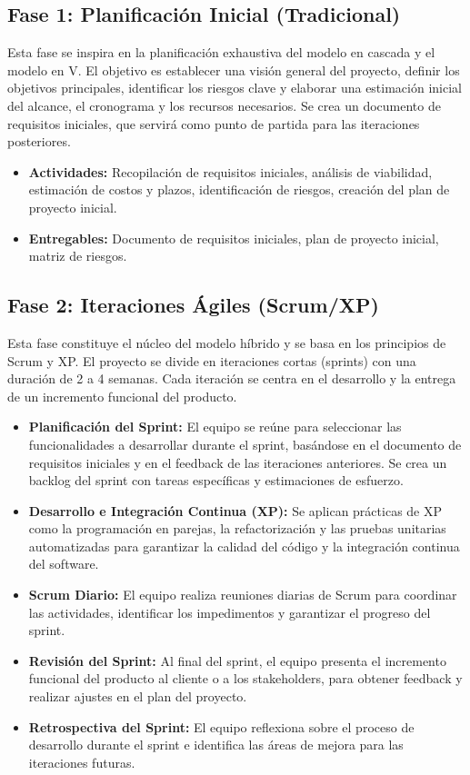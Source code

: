 \documentclass[12pt, spanish]{article}
\begin{document}
\subsection*{Fase 1: Planificación Inicial (Tradicional)}

Esta fase se inspira en la planificación exhaustiva del modelo en cascada y el modelo en V.  El objetivo es establecer una visión general del proyecto, definir los objetivos principales, identificar los riesgos clave y elaborar una estimación inicial del alcance, el cronograma y los recursos necesarios. Se crea un documento de requisitos iniciales, que servirá como punto de partida para las iteraciones posteriores.

\begin{itemize}
    \item \textbf{Actividades:} Recopilación de requisitos iniciales, análisis de viabilidad, estimación de costos y plazos, identificación de riesgos, creación del plan de proyecto inicial.
    \item \textbf{Entregables:} Documento de requisitos iniciales, plan de proyecto inicial, matriz de riesgos.
\end{itemize}

\subsection*{Fase 2: Iteraciones Ágiles (Scrum/XP)}

Esta fase constituye el núcleo del modelo híbrido y se basa en los principios de Scrum y XP. El proyecto se divide en iteraciones cortas (sprints) con una duración de 2 a 4 semanas. Cada iteración se centra en el desarrollo y la entrega de un incremento funcional del producto.

\begin{itemize}
    \item \textbf{Planificación del Sprint:} El equipo se reúne para seleccionar las funcionalidades a desarrollar durante el sprint, basándose en el documento de requisitos iniciales y en el feedback de las iteraciones anteriores.  Se crea un backlog del sprint con tareas específicas y estimaciones de esfuerzo.
    \item \textbf{Desarrollo e Integración Continua (XP):} Se aplican prácticas de XP como la programación en parejas, la refactorización y las pruebas unitarias automatizadas para garantizar la calidad del código y la integración continua del software.
    \item \textbf{Scrum Diario:} El equipo realiza reuniones diarias de Scrum para coordinar las actividades, identificar los impedimentos y garantizar el progreso del sprint.
    \item \textbf{Revisión del Sprint:} Al final del sprint, el equipo presenta el incremento funcional del producto al cliente o a los stakeholders, para obtener feedback y realizar ajustes en el plan del proyecto.
    \item \textbf{Retrospectiva del Sprint:} El equipo reflexiona sobre el proceso de desarrollo durante el sprint e identifica las áreas de mejora para las iteraciones futuras.
\end{itemize}
\end{document}
